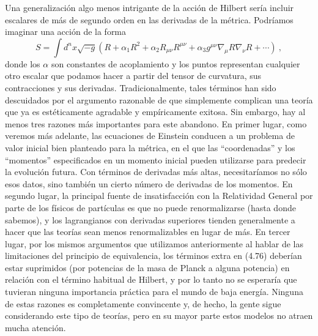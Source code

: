 \documentclass[11pt,b5paper,openany,twoside]{book}
\newcommand{\mn}{{\mu\nu}}
\def\g{{\sqrt{-g}}}
\begin{document}
Una generalización algo menos intrigante de la acción de Hilbert sería incluir escalares de más de segundo orden en las derivadas de la métrica.
Podríamos imaginar una acción de la forma
\begin{equation}
S = \int d^nx \g (R + \alpha_1 R^2 + \alpha_2 R_\mn R^\mn
+\alpha_3 g^\mn \nabla_\mu R \nabla_\nu R +\cdots)\ ,\label{4.76}
\end{equation}
donde los $\alpha$ son constantes de acoplamiento y los puntos representan cualquier otro escalar que podamos hacer a partir del tensor de curvatura, sus contracciones y sus derivadas.
Tradicionalmente, tales términos han sido descuidados por el argumento razonable de que simplemente complican una teoría que ya es estéticamente agradable y empíricamente exitosa.
Sin embargo, hay al menos tres razones más importantes para este abandono.
En primer lugar, como veremos más adelante, las ecuaciones de Einstein conducen a un problema de valor inicial bien planteado para la métrica, en el que las ``coordenadas'' y los ``momentos'' especificados en un momento inicial pueden utilizarse para predecir la evolución futura.
Con términos de derivadas más altas, necesitaríamos no sólo esos datos, sino también un cierto número de derivadas de los momentos.
En segundo lugar, la principal fuente de insatisfacción con la Relatividad General por parte de los físicos de partículas es que no puede renormalizarse (hasta donde sabemos), y los lagrangianos con derivadas superiores tienden generalmente a hacer que las teorías sean menos renormalizables en lugar de más.
En tercer lugar, por los mismos argumentos que utilizamos anteriormente al hablar de las limitaciones del principio de equivalencia, los términos extra en (4.76) deberían estar suprimidos (por potencias de la masa de Planck a alguna potencia) en relación con el término habitual de Hilbert, y por lo tanto no se esperaría que tuvieran ninguna importancia práctica para el mundo de baja energía.
Ninguna de estas razones es completamente convincente y, de hecho, la gente sigue considerando este tipo de teorías, pero en su mayor parte estos modelos no atraen mucha atención.
\end{document}
